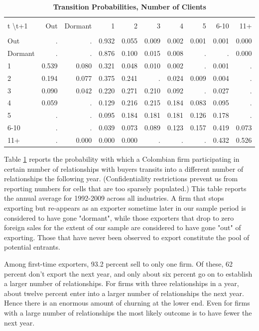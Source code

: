 \documentclass[12pt]{article}
\begin{document}
\begin{table}[bph]
\caption{\textbf{Transition Probabilities, Number of Clients}}
\label{tab:trans_probs}\centering
\begin{tabular}{l|rrrrrrrrr}
\hline\hline
&  &  &  &  &  &  &  &  &  \\[1px] 
t \textbackslash t+1 & Out & Dormant & 1 & 2 & 3 & 4 & 5 & 6-10 & 11+ \\ 
\hline
&  &  &  &  &  &  &  &  &  \\[1px] 
Out & . & . & 0.932 & 0.055 & 0.009 & 0.002 & 0.001 & 0.001 & 0.000 \\ 
Dormant & . & . & 0.876 & 0.100 & 0.015 & 0.008 & . & . & 0.000 \\ 
1 & 0.539 & 0.080 & 0.321 & 0.048 & 0.010 & 0.002 & . & 0.001 & . \\ 
2 & 0.194 & 0.077 & 0.375 & 0.241 & . & 0.024 & 0.009 & 0.004 & . \\ 
3 & 0.090 & 0.042 & 0.220 & 0.271 & 0.210 & 0.092 & . & 0.027 & . \\ 
4 & 0.059 & . & 0.129 & 0.216 & 0.215 & 0.184 & 0.083 & 0.095 & . \\ 
5 & . & . & 0.095 & 0.184 & 0.181 & 0.181 & 0.126 & 0.178 & . \\ 
6-10 & . & . & 0.039 & 0.073 & 0.089 & 0.123 & 0.157 & 0.419 & 0.073 \\ 
11+ & . & 0.000 & 0.000 & 0.000 & . & . & . & 0.432 & 0.526 \\ \hline
\end{tabular}
\centering
\end{table}

Table \ref{tab:trans_probs} reports the probability with which a Colombian
firm participating in certain number of relationships with buyers transits
into a different number of relationships the following year.
(Confidentiality restrictions prevent us from reporting numbers for cells
that are too sparsely populated.) This table reports the annual average for
1992-2009 across all industries. A firm that stops exporting but re-appears
as an exporter sometime later in our sample period is considered to have
gone "dormant", while those exporters that drop to zero foreign sales for
the extent of our sample are considered to have gone "out" of exporting.
Those that have never been observed to export constitute the pool of
potential entrants.

Among first-time exporters, 93.2 percent sell to only one firm. Of these, 62
percent don't export the next year, and only about six percent go on to
establish a larger number of relationships. For firms with three
relationships in a year, about twelve percent enter into a larger number of
relationships the next year. Hence there is an enormous amount of churning
at the lower end. Even for firms with a large number of relationships the
most likely outcome is to have fewer the next year.
\end{document}
